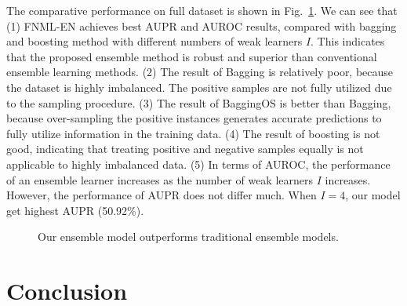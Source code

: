 \documentclass[conference]{IEEEtran}
\begin{document}
The comparative performance on full dataset is shown in Fig.~\ref{fig:ensemblecompare}. We can see that (1) FNML-EN achieves best AUPR and AUROC results, compared with bagging and boosting method with different numbers of weak learners $I$. This indicates that the proposed ensemble method is robust and superior than conventional ensemble learning methods. (2) The result of Bagging is relatively poor, because the dataset is highly imbalanced. The positive samples are not fully utilized due to the sampling procedure. (3) The result of BaggingOS is better than Bagging, because over-sampling the positive instances generates accurate predictions to fully utilize information in the training data. (4) The result of boosting is not good, indicating that treating positive and negative samples equally is not applicable to highly imbalanced data. (5) In terms of AUROC, the performance of an ensemble learner increases as the number of weak learners $I$ increases. However, the performance of AUPR does not differ much. When $I=4$, our model get highest AUPR (50.92\%).
\begin{figure}[t]
\centering
{}
\vspace*{-10pt}
\caption{Our ensemble model outperforms traditional ensemble models.}\label{fig:ensemblecompare}
\end{figure}
\section{Conclusion}\label{sec:conclusion}
\end{document}
